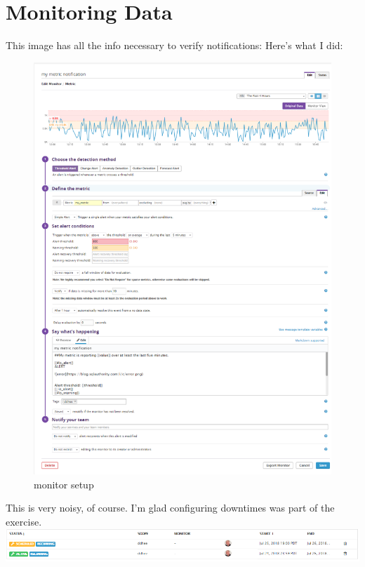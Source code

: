 \documentclass[11pt]{article}
\makeatletter
\def\maxwidth{\ifdim\Gin@nat@width>\linewidth\linewidth
    \else\Gin@nat@width\fi}
\let\Oldincludegraphics\includegraphics
\renewcommand{\includegraphics}[1]{\Oldincludegraphics[width=.8\maxwidth]{#1}}
\makeatother
\begin{document}
    \section{Monitoring Data}\label{monitoring-data}

    This image has all the info necessary to verify notifications: Here's
what I did:

\begin{figure}
\centering
\includegraphics{images/monitorpage.png}
\caption{monitor setup}
\end{figure}

This is very noisy, of course. I'm glad configuring downtimes was part
of the exercise. \includegraphics{images/downtime.png}
\end{document}
